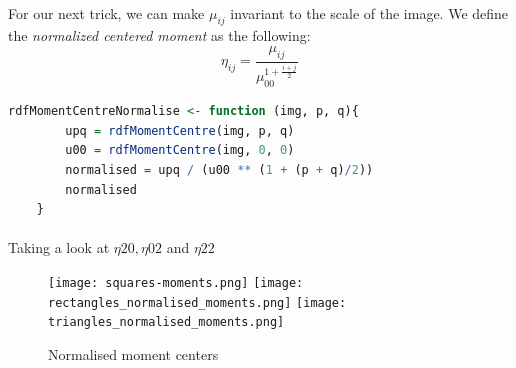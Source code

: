 \paragraph{}
For our next trick, we can make $\mu_{ij}$ invariant to the scale of the image. We define the \emph{normalized centered moment} as the following:
$$\eta_{ij} = \frac{\mu_{ij}}{\mu_{00}^{1 + \frac{i + j}{2}}}$$

\begin{lstlisting}[language=R, caption=Calculating normalised centered moments]
    rdfMomentCentreNormalise <- function (img, p, q){
        upq = rdfMomentCentre(img, p, q)
        u00 = rdfMomentCentre(img, 0, 0)
        normalised = upq / (u00 ** (1 + (p + q)/2))
        normalised
    }
\end{lstlisting}

\paragraph{}
Taking a look at $\eta{20}, \eta{02}$ and $\eta{22}$

\begin{figure}[h]
    \texttt{[image: squares-moments.png]}
    \texttt{[image: rectangles\_normalised\_moments.png]}
    \texttt{[image: triangles\_normalised\_moments.png]}
    \caption{Normalised moment centers}
\end{figure}



